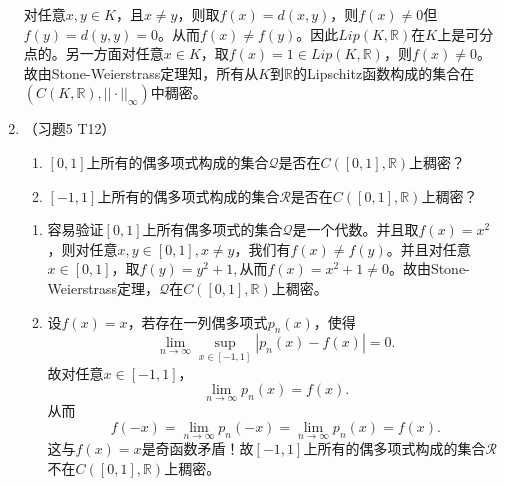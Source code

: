 \begin{enumerate}
\begin{answer}
      对任意$x,y\in K$，且$x\not= y$，则取$f(x)=d(x,y)$，则$f(x)\not= 0$但$f(y)=d(y,y)=0$。从而$f(x)\not= f(y)$。因此$Lip(K,\mathbb{R})$在$K$上是可分点的。另一方面对任意$x\in K$，取$f(x)=1\in Lip(K,\mathbb{R})$，则$f(x)\not=0$。故由Stone-Weierstrass定理知，所有从$K$到$\mathbb{R}$的Lipschitz函数构成的集合在$(C(K,\mathbb{R}),||\cdot||_{\infty})$中稠密。
    \end{answer}
  \item （习题5 T12）
    \begin{enumerate}
      \item $\left[0,1\right]$上所有的偶多项式构成的集合$\mathcal{Q}$是否在$C(\left[0,1\right],\mathbb{R} )$上稠密？ 
      \item $\left[-1,1\right]$上所有的偶多项式构成的集合$\mathcal{R}$是否在$C(\left[0,1\right],\mathbb{R})$上稠密？ 
    \end{enumerate}
    \begin{answer}
      \begin{enumerate}
        \item 容易验证$[0,1]$上所有偶多项式的集合$\mathcal{Q}$是一个代数。并且取$f(x)=x^2$，则对任意$x,y\in[0,1],x\not= y$，我们有$f(x)\not=f(y)$。并且对任意$x\in[0,1]$，取$f(y)=y^2+1,$从而$f(x)=x^2+1\not=0$。故由Stone-Weierstrass定理，$\mathcal{Q}$在$C([0,1],\mathbb{R})$上稠密。 
        \item 设$f(x)=x$，若存在一列偶多项式$p_n(x)$，使得
        \[\lim\limits_{n\rightarrow \infty} \sup_{x\in[-1,1]}|p_n(x)-f(x)|=0.\]
        故对任意$x\in [-1,1]$，
        \[\lim\limits_{n\rightarrow \infty}p_n(x)=f(x).\]
        从而
        \[f(-x)=\lim\limits_{n\rightarrow \infty}p_n(-x)=\lim\limits_{n\rightarrow \infty}p_n(x)=f(x).\]
        这与$f(x)=x$是奇函数矛盾！故$\left[-1,1\right]$上所有的偶多项式构成的集合$\mathcal{R}$不在$C(\left[0,1\right],\mathbb{R})$上稠密。
      \end{enumerate}
    \end{answer}
\end{enumerate}




